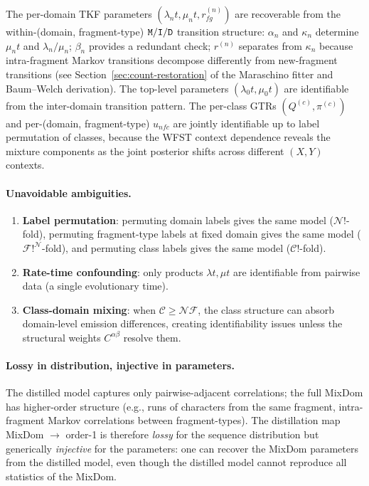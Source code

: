 \documentclass{article}
\newcommand\insrate{\lambda}
\newcommand\delrate{\mu}
\newcommand\ext{r}
\newcommand\main{0}
\newcommand\dom{n}
\newcommand\ndom{\mathcal{N}}
\newcommand\nfrag{\mathcal{F}}
\newcommand\classdist{u}
\newcommand\eqm{\pi}
\providecommand\exch{Q}
\newcommand\evoltime{t}
\newcommand\mat{{\tt M}}
\newcommand\ins{{\tt I}}
\newcommand\del{{\tt D}}
\newcommand\frag{f}
\newcommand\srcfrag{f}
\newcommand\destfrag{g}
\newcommand\class{c}
\newcommand\nclasses{\mathcal{C}}
\begin{document}
The per-domain TKF parameters $(\insrate_\dom\evoltime,
\delrate_\dom\evoltime, \ext^{(\dom)}_{\srcfrag\destfrag})$ are
recoverable from the within-(domain, fragment-type) $\mat/\ins/\del$
transition structure: $\alpha_\dom$ and $\kappa_\dom$ determine
$\delrate_\dom\evoltime$ and $\insrate_\dom/\delrate_\dom$;
$\beta_\dom$ provides a redundant check;
$\ext^{(\dom)}$ separates from $\kappa_\dom$ because intra-fragment
Markov transitions decompose differently from new-fragment transitions
(see Section~\ref{sec:count-restoration} of the Maraschino fitter and
Baum--Welch derivation). The top-level parameters
$(\insrate_\main\evoltime, \delrate_\main\evoltime)$ are identifiable
from the inter-domain transition pattern. The per-class GTRs
$(\exch^{(\class)}, \eqm^{(\class)})$ and per-(domain, fragment-type)
$\classdist_{\dom\frag\class}$ are jointly identifiable up to label
permutation of classes, because the WFST context dependence reveals the
mixture components as the joint posterior shifts across different
$(X, Y)$ contexts.

\paragraph{Unavoidable ambiguities.}
\begin{enumerate}
\item \textbf{Label permutation}: permuting domain labels gives the
  same model ($\ndom!$-fold), permuting fragment-type labels at fixed
  domain gives the same model ($\nfrag!^\ndom$-fold), and permuting
  class labels gives the same model ($\nclasses!$-fold).
\item \textbf{Rate-time confounding}: only products
  $\insrate\evoltime, \delrate\evoltime$ are identifiable from
  pairwise data (a single evolutionary time).
\item \textbf{Class-domain mixing}: when $\nclasses \geq \ndom\nfrag$,
  the class structure can absorb domain-level emission differences,
  creating identifiability issues unless the structural weights
  $C^{\alpha\beta}$ resolve them.
\end{enumerate}

\paragraph{Lossy in distribution, injective in parameters.}
The distilled model captures only pairwise-adjacent correlations;
the full MixDom has higher-order structure (e.g., runs of characters
from the same fragment, intra-fragment Markov correlations between
fragment-types). The distillation map MixDom $\to$ order-1 is
therefore \emph{lossy} for the sequence distribution but generically
\emph{injective} for the parameters: one can recover the MixDom
parameters from the distilled model, even though the distilled model
cannot reproduce all statistics of the MixDom.
\end{document}

